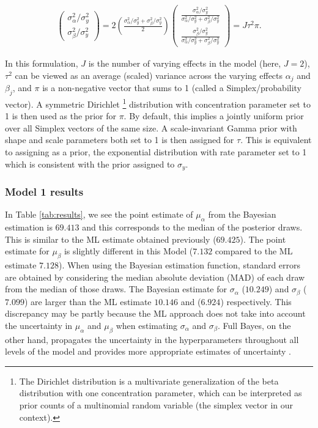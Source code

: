 \begin{align}
	\left(\begin{matrix}
		\sigma_\alpha^2/\sigma_y^2 \\
		\sigma_\beta^2/\sigma_y^2
	\end{matrix} \right) =
	2\left(\frac{\sigma_\alpha^2/\sigma_y^2 + \sigma_\beta^2/\sigma_y^2}{2}\right)\left(\begin{matrix}
		\frac{\sigma_\alpha^2/\sigma_y^2}{\sigma_\alpha^2/\sigma_y^2 + \sigma_\beta^2/\sigma_y^2} \\
		\frac{\sigma_\beta^2/\sigma_y^2}{\sigma_\alpha^2/\sigma_y^2 + \sigma_\beta^2/\sigma_y^2}
	\end{matrix} \right)=
	J\tau^2 \pi.
\end{align}



In this formulation, $J$ is the number of varying effects in the model (here, $J=2$), $\tau^2$ can be viewed as an average (scaled) variance across the varying effects $\alpha_j$ and $\beta_j$, and $\pi$ is a non-negative vector that sums to 1 (called a Simplex/probability vector).  A symmetric Dirichlet \footnote{The Dirichlet distribution is a multivariate generalization of the beta distribution with one concentration parameter, which can be interpreted as prior counts of a multinomial random variable (the simplex vector in our context).} distribution with concentration parameter set to 1 is then used as the prior for $\pi$.  By default, this implies a jointly uniform prior over all Simplex vectors of the same size.  A scale-invariant Gamma prior with shape and scale parameters both set to 1 is then assigned for $\tau$.  This is equivalent to assigning as a prior, the exponential distribution with rate parameter set to 1 which is consistent with the prior assigned to $\sigma_y$.

\subsubsection*{Model 1 results}
In Table \ref{tab:results}, we see the point estimate of $\mu_{\alpha}$ from the Bayesian estimation is $69.413$ and this corresponds to the median of the posterior draws.  This is similar to the ML estimate obtained previously ($69.425$).  The point estimate for $\mu_{\beta}$  is slightly different in this Model ($7.132$ compared to the ML estimate $7.128$). When using the Bayesian estimation function, standard errors are obtained by considering the median absolute deviation (MAD) of each draw from the median of those draws.  The Bayesian estimate for $\sigma_{\alpha}$ ($10.249$) and $\sigma_{\beta}$ ($7.099$) are larger than the ML estimate $10.146$ and ($6.924$) respectively. This discrepancy may be partly because the ML approach does not take into account the uncertainty in $\mu_{\alpha}$ and $\mu_{\beta}$ when estimating $\sigma_{\alpha}$ and $\sigma_{\beta}$. Full Bayes, on the other hand, propagates the uncertainty in the hyperparameters throughout all levels of the model and provides more appropriate estimates of uncertainty \cite{browne2006comparison}.

